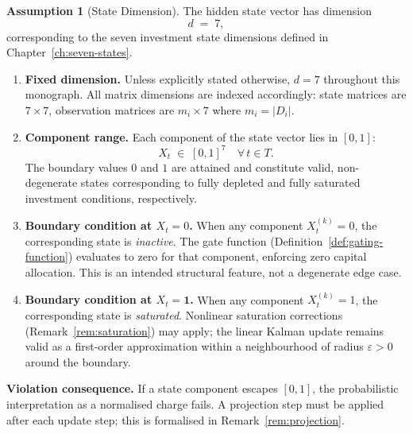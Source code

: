 \documentclass[12pt,openany]{book}
\numberwithin{equation}{chapter}
\theoremstyle{plain}
\theoremstyle{definition}
\newtheorem{assumption}[theorem]{Assumption}
\theoremstyle{remark}
\def\mathcal#1{#1}%
\begin{document}
\begin{assumption}[State Dimension]
\label{asm:dimension}
The hidden state vector has dimension
\begin{equation}
  d \;=\; 7,
  \label{eq:state-dim}
\end{equation}
corresponding to the seven investment state dimensions defined
in Chapter~\ref{ch:seven-states}.

\begin{enumerate}[label=\textbf{A4.\arabic*.}, leftmargin=*, widest=A4.4.]
  \item \textbf{Fixed dimension.}
        Unless explicitly stated otherwise, $d = 7$ throughout
        this monograph.  All matrix dimensions are indexed
        accordingly: state matrices are
        $7 \times 7$, observation matrices are
        $m_i \times 7$ where $m_i = |\mathcal{D}_i|$.

  \item \textbf{Component range.}
        Each component of the state vector lies in $[0,1]$:
        \begin{equation}
          X_t \;\in\; [0,1]^7
          \quad \forall\, t \in \mathcal{T}.
          \label{eq:state-range}
        \end{equation}
        The boundary values $0$ and $1$ are attained and
        constitute valid, non-degenerate states corresponding
        to fully depleted and fully saturated investment
        conditions, respectively.

  \item \textbf{Boundary condition at $X_t = 0$.}
        When any component $X_t^{(k)} = 0$, the corresponding
        state is \emph{inactive}.  The gate function
        (Definition~\ref{def:gating-function}) evaluates to zero for that
        component, enforcing zero capital allocation.  This is
        an intended structural feature, not a degenerate edge
        case.

  \item \textbf{Boundary condition at $X_t = \mathbf{1}$.}
        When any component $X_t^{(k)} = 1$, the corresponding
        state is \emph{saturated}.  Nonlinear saturation
        corrections (Remark~\ref{rem:saturation}) may apply;
        the linear Kalman update remains valid as a
        first-order approximation within a neighbourhood of
        radius $\varepsilon > 0$ around the boundary.
\end{enumerate}

\noindent\textbf{Violation consequence.}  If a state component
escapes $[0,1]$, the probabilistic interpretation as a
normalised charge fails.  A projection step must be applied
after each update step; this is formalised in
Remark~\ref{rem:projection}.
\end{assumption}
\end{document}

